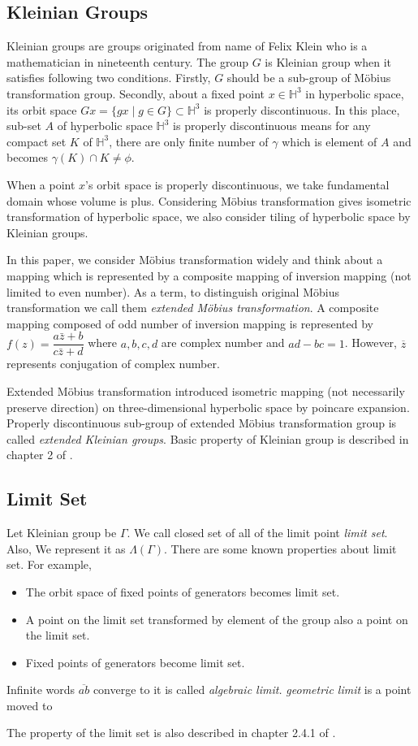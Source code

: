 \subsection{Kleinian Groups}

Kleinian groups are groups originated from name of Felix Klein who is
a mathematician in nineteenth century.
The group $G$ is Kleinian group when it satisfies following two
conditions. 
Firstly, $G$ should be a sub-group of M\"obius transformation group.
Secondly, about a fixed point $x\in\mathbb{H}^3$ in hyperbolic space,
its orbit space $Gx = \{ gx \mid g\in G\}\subset \mathbb{H}^3$
is properly discontinuous.
In this place, sub-set $A$ of hyperbolic space $\mathbb{H}^3$
is properly discontinuous means
for any compact set $K$ of $\mathbb{H}^3$,
there are only finite number of $\gamma$ which is element of $A$
and becomes $\gamma (K) \cap K \neq \phi$.

When a point $x$'s orbit space is properly discontinuous, we take
fundamental domain whose volume is plus.
Considering M\"obius transformation gives isometric transformation of
hyperbolic space, we also consider tiling of hyperbolic space by
Kleinian groups. 

In this paper, we consider M\"obius transformation widely and
think about a mapping which is represented by a composite mapping of
inversion mapping (not limited to even number).
As a term, to distinguish original M\"obius transformation
we call them \textit{extended M\"obius transformation}.
A composite mapping composed of odd number of inversion mapping
is represented by $f(z)=\dfrac{a{\bar{z}}+b}{c{\bar{z}}+d}$ where
$a, b, c, d$ are complex number and $ad-bc = 1$.
However, $\overline{z}$ represents conjugation of complex number.

Extended M\"obius transformation introduced isometric mapping (not
necessarily preserve direction) on three-dimensional hyperbolic space by
poincare expansion.
Properly discontinuous sub-group of extended M\"obius transformation group
is called \textit{extended Kleinian groups}.
Basic property of Kleinian group is described in chapter 2 of \cite{marden_2016}.

\subsection{Limit Set}

Let Kleinian group be $\Gamma$.
We call closed set of all of the limit point \textit{limit set}.
Also, We represent it as $\Lambda(\Gamma)$.
There are some known properties about limit set.
For example,
\begin{itemize}
 \item The orbit space of fixed points of generators becomes limit set.
 \item A point on the limit set transformed by element of the group 
       also a point on the limit set.
 \item Fixed points of generators become limit set.
\end{itemize}

Infinite words $\overline{ab}$ converge to it is called \textit{algebraic limit.}
\textit{geometric limit} is a point moved to

The property of the limit set is also described in chapter 2.4.1 of
\cite{marden_2016}.